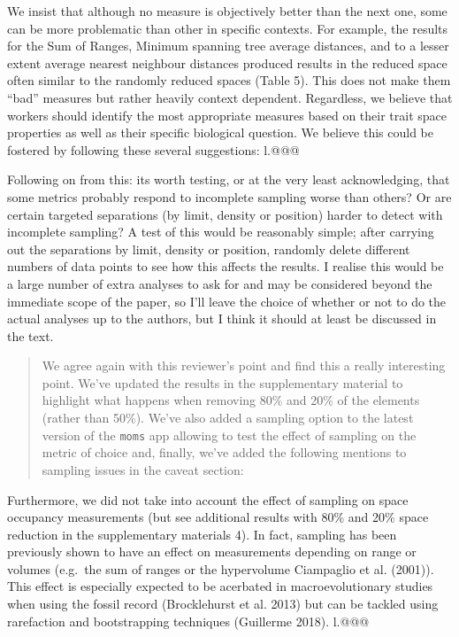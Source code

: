 \documentclass[]{article}
\begin{document}
We insist that although no measure is objectively better than the next
one, some can be more problematic than other in specific contexts. For
example, the results for the Sum of Ranges, Minimum spanning tree
average distances, and to a lesser extent average nearest neighbour
distances produced results in the reduced space often similar to the
randomly reduced spaces (Table 5). This does not make them ``bad''
measures but rather heavily context dependent. Regardless, we believe
that workers should identify the most appropriate measures based on
their trait space properties as well as their specific biological
question. We believe this could be fostered by following these several
suggestions: l.@@@

Following on from this: its worth testing, or at the very least
acknowledging, that some metrics probably respond to incomplete sampling
worse than others? Or are certain targeted separations (by limit,
density or position) harder to detect with incomplete sampling? A test
of this would be reasonably simple; after carrying out the separations
by limit, density or position, randomly delete different numbers of data
points to see how this affects the results. I realise this would be a
large number of extra analyses to ask for and may be considered beyond
the immediate scope of the paper, so I'll leave the choice of whether or
not to do the actual analyses up to the authors, but I think it should
at least be discussed in the text.

\begin{quote}
We agree again with this reviewer's point and find this a really
interesting point. We've updated the results in the supplementary
material to highlight what happens when removing 80\% and 20\% of the
elements (rather than 50\%). We've also added a sampling option to the
latest version of the \texttt{moms} app allowing to test the effect of
sampling on the metric of choice and, finally, we've added the following
mentions to sampling issues in the caveat section:
\end{quote}

Furthermore, we did not take into account the effect of sampling on
space occupancy measurements (but see additional results with 80\% and
20\% space reduction in the supplementary materials 4). In fact,
sampling has been previously shown to have an effect on measurements
depending on range or volumes (e.g.~the sum of ranges or the hypervolume
Ciampaglio et al. (2001)). This effect is especially expected to be
acerbated in macroevolutionary studies when using the fossil record
(Brocklehurst et al. 2013) but can be tackled using rarefaction and
bootstrapping techniques (Guillerme 2018). l.@@@
\end{document}
